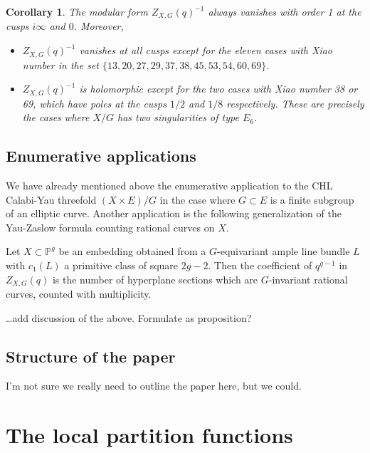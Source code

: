 \documentclass{article}
\newtheorem{corollary}[theorem]{Corollary}
\theoremstyle{definition}
\newcommand{\PP}{\mathbb{P}}
\begin{document}
\begin{corollary}\label{cor: vanishing at cusps}
The modular form $Z_{X,G}(q)^{-1}$ always vanishes with order 1 at the cusps
$i\infty$ and $0$. Moreover,
\begin{itemize}
\item $Z_{X,G}(q)^{-1}$ vanishes at all cusps except for the eleven
cases with Xiao number in the set $\{13,20,27,29,37,38,45,53,54,60,69 \}$.
\item $Z_{X,G}(q)^{-1}$ is holomorphic except for the two cases with
Xiao number 38 or 69, which have poles at the cusps $1/2$ and $1/8$
respectively. These are precisely the cases where $X/G$ has two
singularities of type $E_{6}$.
\end{itemize}
\end{corollary}


\subsection{Enumerative applications}\label{subsec: enumerative applications}

We have already mentioned above the enumerative application to the CHL
Calabi-Yau threefold $(X\times E)/G$ in the case where $G\subset E$ is
a finite subgroup of an elliptic curve. Another application is the
following generalization of the Yau-Zaslow formula counting rational
curves on $X$.

Let $X\subset \PP^{g}$ be an embedding obtained from a $G$-equivariant
ample line bundle $L$ with $c_{1}(L)$ a primitive class of square
$2g-2$. Then the coefficient of $q^{g-1}$ in $Z_{X,G}(q)$ is the
number of hyperplane sections which are $G$-invariant rational curves,
counted with multiplicity.

\dots add discussion of the above. Formulate as proposition?


\subsection{Structure of the paper}

I'm not sure we really need to outline the paper here, but we could.


\section{The local partition functions}\label{sec: local partition functions}
\end{document}
